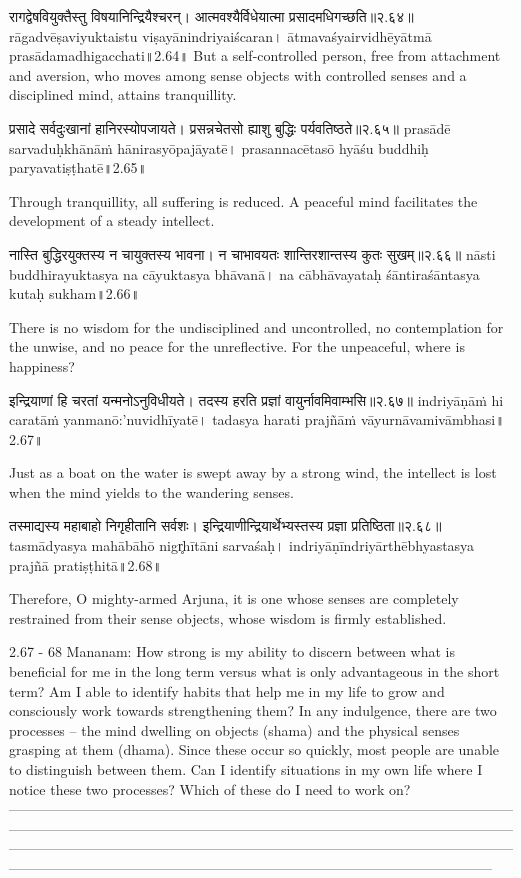 रागद्वेषवियुक्तैस्तु विषयानिन्द्रियैश्चरन्।
आत्मवश्यैर्विधेयात्मा प्रसादमधिगच्छति॥२.६४॥
rāgadvēṣaviyuktaistu viṣayānindriyaiścaran।
ātmavaśyairvidhēyātmā prasādamadhigacchati॥2.64॥
But a self-controlled person, free from attachment and aversion, who moves among sense objects with controlled senses and a disciplined mind, attains tranquillity.


प्रसादे सर्वदुःखानां हानिरस्योपजायते।
प्रसन्नचेतसो ह्याशु बुद्धिः पर्यवतिष्ठते॥२.६५॥
prasādē sarvaduḥkhānāṁ hānirasyōpajāyatē।
prasannacētasō hyāśu buddhiḥ paryavatiṣṭhatē॥2.65॥

Through tranquillity, all suffering is reduced. A peaceful mind facilitates the development of a steady intellect.


नास्ति बुद्धिरयुक्तस्य न चायुक्तस्य भावना।
 न चाभावयतः शान्तिरशान्तस्य कुतः सुखम्॥२.६६॥
nāsti buddhirayuktasya na cāyuktasya bhāvanā।
na cābhāvayataḥ śāntiraśāntasya kutaḥ sukham॥2.66॥

There is no wisdom for the undisciplined and uncontrolled, no contemplation for the unwise, and no peace for the unreflective. For the unpeaceful, where is happiness?


इन्द्रियाणां हि चरतां यन्मनोऽनुविधीयते। 
तदस्य हरति प्रज्ञां वायुर्नावमिवाम्भसि॥२.६७॥
indriyāṇāṁ hi caratāṁ yanmanō:'nuvidhīyatē। 
tadasya harati prajñāṁ vāyurnāvamivāmbhasi॥2.67॥


Just as a boat on the water is swept away by a strong wind, the intellect is lost when the mind yields to the wandering senses.  


तस्माद्यस्य महाबाहो निगृहीतानि सर्वशः। 
इन्द्रियाणीन्द्रियार्थेभ्यस्तस्य प्रज्ञा प्रतिष्ठिता॥२.६८॥
tasmādyasya mahābāhō nigr̥hītāni sarvaśaḥ। 
indriyāṇīndriyārthēbhyastasya prajñā pratiṣṭhitā॥2.68॥

Therefore, O mighty-armed Arjuna, it is one whose senses are completely restrained from their sense objects, whose wisdom is firmly established.

2.67 - 68 Mananam:
How strong is my ability to discern between what is beneficial for me in the long term versus what is only advantageous in the  short term? Am I able to identify habits that help me in my life to grow and consciously work towards strengthening them?
In any indulgence, there are two processes – the mind dwelling on objects (shama) and the physical senses grasping at them (dhama). Since these occur so quickly, most people are unable to distinguish between them. Can I identify situations in my own life where I notice these two processes? Which of these do I need to work on?
—-----------------------------------------------------------------------------------------------------------------------------------------------------------------------------------------------------------------------------------------------------------------------------------------------------------------------------------------------------------------------------------------------------------------------------------------

